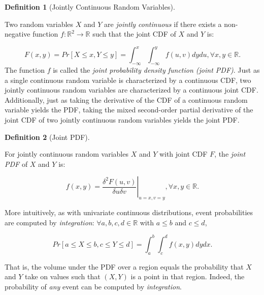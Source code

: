 \documentclass[
]{article}
\theoremstyle{definition}
\newtheorem{definition}{Definition}[section]
\theoremstyle{definition}
\theoremstyle{definition}
\theoremstyle{remark}
\begin{document}
\begin{definition}[Jointly Continuous Random Variables]
\protect\hypertarget{def:unlabeled-div-47}{}\label{def:unlabeled-div-47}

Two random variables \(X\) and \(Y\) are \emph{jointly continuous} if there exists a non-negative function \(f:\mathbb{R}^2 \to \mathbb{R}\) such that the joint CDF of \(X\) and \(Y\) is:

\[F(x,y) = Pr[X \leq x, Y \leq y] = \int_{-\infty}^x \int_{-\infty}^y f(u,v) dydu, \forall x,y \in \mathbb{R}.\]
The function \(f\) is called the \emph{joint probability density function (joint PDF)}. Just as a single continuous random variable is characterized by a continuous CDF, two jointly continuous random variables are characterized by a continuous joint CDF. Additionally, just as taking the derivative of the CDF of a continuous random variable yields the PDF, taking the mixed second-order partial derivative of the joint CDF of two jointly continuous random variables yields the joint PDF.

\end{definition}

\begin{definition}[Joint PDF]
\protect\hypertarget{def:unlabeled-div-48}{}\label{def:unlabeled-div-48}

For jointly continuous random variables \(X\) and \(Y\) with joint CDF \(F\), the \emph{joint PDF} of \(X\) and \(Y\) is:

\[f(x,y) = \left.\frac{\delta^2F(u,v)}{\delta u \delta v} \right\vert_{u=x,v=y}, \forall x,y \in \mathbb{R}.\]

More intuitively, as with univariate continuous distributions, event probabilities are computed by \emph{integration}: \(\forall a,b,c,d \in \mathbb{R}\) with \(a \leq b\) and \(c \leq d\),

\[Pr[a \leq X \leq b, c \leq Y \leq d] = \int_a^b \int_c^d f(x,y) dydx.\]

That is, the volume under the PDF over a region equals the probability that \(X\) and \(Y\) take on values such that \((X,Y)\) is a point in that region. Indeed, the probability of \emph{any} event can be computed by \emph{integration}.

\end{definition}
\end{document}
